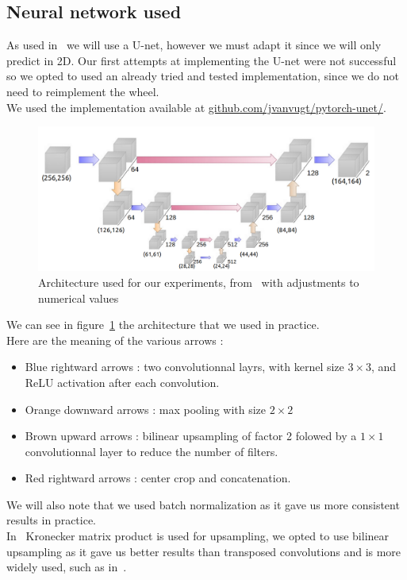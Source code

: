 \subsection{Neural network used}

As used in~\cite{funker_large_2019} we will use a U-net, however we must adapt
it since we will only predict in 2D. Our first attempts at implementing the
U-net were not successful so we opted to used an already tried and tested
implementation, since we do not need to reimplement the wheel.\\
We used the implementation available at
\hyperlink{https://github.com/jvanvugt/pytorch-unet/}{github.com/jvanvugt/pytorch-unet/}.

\begin{figure}[!htbp]
	\centering
	\includegraphics[width=1\linewidth]{./images/archi_unet.png}
	\caption{Architecture used for our experiments,
	from~\cite{funke_large_2019} with adjustments to numerical values}%
	\label{fig:archi_unet}
\end{figure}

We can see in figure~\ref{fig:archi_unet} the architecture that we used in
practice.\\
Here are the meaning of the various arrows :
\begin{itemize}
	\item Blue rightward arrows : two convolutionnal layrs, with kernel size
		$3\times3$, and ReLU activation after each convolution.
	\item Orange downward arrows : max pooling with size $2\times2$
	\item Brown upward arrows : bilinear upsampling of factor 2 folowed by a
		$1\times1$ convolutionnal layer to reduce the number of filters.
	\item Red rightward arrows : center crop and concatenation.
\end{itemize}
We will also note that we used batch normalization as it gave us more
consistent results in practice.\\
In~\cite{funke_large_2019} Kronecker matrix product is used for upsampling, we
opted to use bilinear upsampling as it gave us better results than transposed
convolutions and is more widely used, such as in~\cite{ronneberger_2015}.\\

